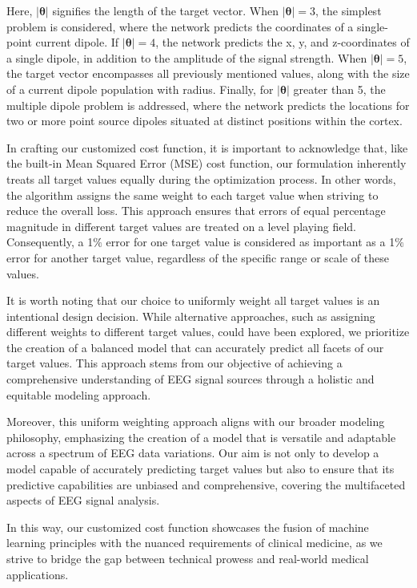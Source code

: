 \documentclass[a4paper, UKenglish, 11pt]{uiomaster}
\begin{document}
Here, $| \boldsymbol{\theta} |$ signifies the length of the target vector. When $| \boldsymbol{\theta} | = 3$, the simplest problem is considered, where the network predicts the coordinates of a single-point current dipole. If $| \boldsymbol{\theta} | = 4$, the network predicts the x, y, and z-coordinates of a single dipole, in addition to the amplitude of the signal strength. When $| \boldsymbol{\theta} | = 5$, the target vector encompasses all previously mentioned values, along with the size of a current dipole population with radius. Finally, for $| \boldsymbol{\theta} |$ greater than 5, the multiple dipole problem is addressed, where the network predicts the locations for two or more point source dipoles situated at distinct positions within the cortex.

In crafting our customized cost function, it is important to acknowledge that, like the built-in Mean Squared Error (MSE) cost function, our formulation inherently treats all target values equally during the optimization process. In other words, the algorithm assigns the same weight to each target value when striving to reduce the overall loss. This approach ensures that errors of equal percentage magnitude in different target values are treated on a level playing field. Consequently, a 1$\%$ error for one target value is considered as important as a 1$\%$ error for another target value, regardless of the specific range or scale of these values.

It is worth noting that our choice to uniformly weight all target values is an intentional design decision. While alternative approaches, such as assigning different weights to different target values, could have been explored, we prioritize the creation of a balanced model that can accurately predict all facets of our target values. This approach stems from our objective of achieving a comprehensive understanding of EEG signal sources through a holistic and equitable modeling approach.

Moreover, this uniform weighting approach aligns with our broader modeling philosophy, emphasizing the creation of a model that is versatile and adaptable across a spectrum of EEG data variations. Our aim is not only to develop a model capable of accurately predicting target values but also to ensure that its predictive capabilities are unbiased and comprehensive, covering the multifaceted aspects of EEG signal analysis.

In this way, our customized cost function showcases the fusion of machine learning principles with the nuanced requirements of clinical medicine, as we strive to bridge the gap between technical prowess and real-world medical applications.
\end{document}
